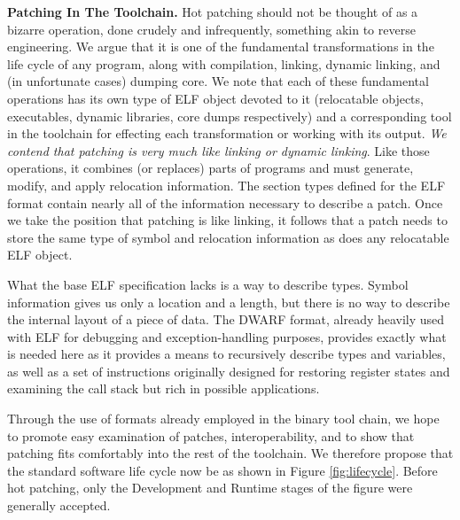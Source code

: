 {\bf Patching In The Toolchain.}
\label{ssec:patchingvlinking}
Hot patching should not be thought of as a bizarre operation, done
crudely and infrequently, something akin to reverse engineering. We
argue that it is one of the fundamental transformations in the life
cycle of any program, along with compilation, linking, dynamic
linking, and (in unfortunate cases) dumping core. We note that each of
these fundamental operations has its own type of ELF object devoted to
it (relocatable objects, executables, dynamic libraries, core dumps
respectively) and a corresponding tool in the toolchain for effecting
each transformation or working with its output. \emph{We contend that
patching is very much like linking or dynamic linking}. Like those
operations, it combines (or replaces) parts of programs and must
generate, modify, and apply relocation information. The section types
defined for the ELF format contain nearly all of the information
necessary to describe a patch. Once we take the position that patching
is like linking, it follows that a patch needs to store the same type
of symbol and relocation information as does any relocatable ELF
object.

What the base ELF specification lacks is a way to describe
types. Symbol information gives us only a location and a length, but
there is no way to describe the internal layout of a piece of
data. The DWARF format, already heavily used with ELF for debugging
and exception-handling purposes, provides exactly what is needed here
as it provides a means to recursively describe types and variables, as
well as a set of instructions originally designed for restoring
register states and examining the call stack but rich in possible
applications. 

Through the use of formats already employed in the binary tool chain, we
hope to promote easy examination of patches, interoperability, and to
show that patching fits comfortably into the rest of the
toolchain. We therefore propose that the standard software life cycle
now be as shown in Figure \ref{fig:lifecycle}. Before hot
patching, only the Development and Runtime stages of the figure were
generally accepted.

